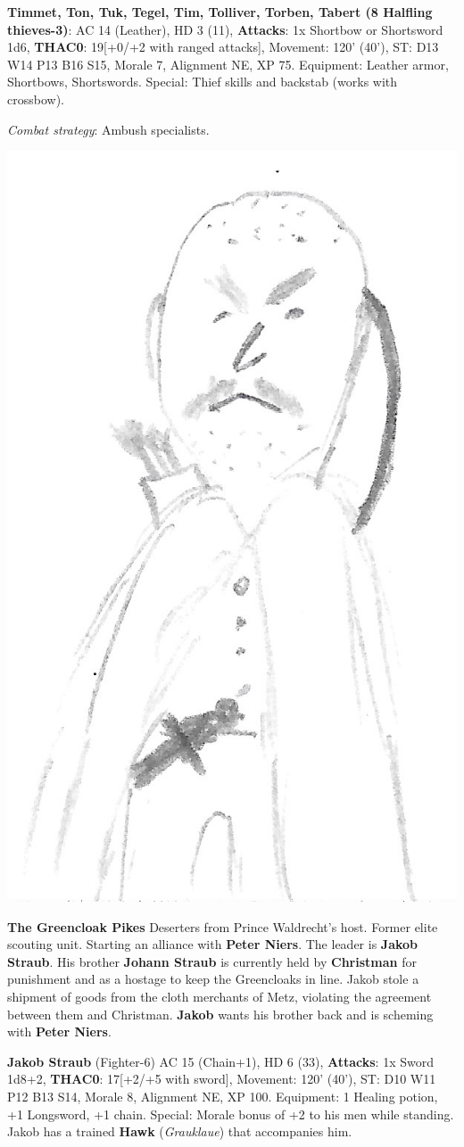 \documentclass[
]{book}
\begin{document}
\textbf{Timmet, Ton, Tuk, Tegel, Tim, Tolliver, Torben, Tabert (8 Halfling thieves-3)}: AC 14 (Leather), HD 3 (11), \textbf{Attacks}: 1x Shortbow or Shortsword 1d6, \textbf{THAC0}: 19{[}+0/+2 with ranged attacks{]}, Movement: 120' (40'), ST: D13 W14 P13 B16 S15, Morale 7, Alignment NE, XP 75. Equipment: Leather armor, Shortbows, Shortswords. Special: Thief skills and backstab (works with crossbow).

\emph{Combat strategy}: Ambush specialists.

\begin{center}\includegraphics[width=0.5\linewidth]{graphics/halfling1} \end{center}

\textbf{The Greencloak Pikes}
Deserters from Prince Waldrecht's host. Former elite scouting unit. Starting an alliance with \textbf{Peter Niers}. The leader is \textbf{Jakob Straub}. His brother \textbf{Johann Straub} is currently held by \textbf{Christman} for punishment and as a hostage to keep the Greencloaks in line. Jakob stole a shipment of goods from the cloth merchants of Metz, violating the agreement between them and Christman. \textbf{Jakob} wants his brother back and is scheming with \textbf{Peter Niers}.

\textbf{Jakob Straub} (Fighter-6) AC 15 (Chain+1), HD 6 (33), \textbf{Attacks}: 1x Sword 1d8+2, \textbf{THAC0}: 17{[}+2/+5 with sword{]}, Movement: 120' (40'), ST: D10 W11 P12 B13 S14, Morale 8, Alignment NE, XP 100. Equipment: 1 Healing potion, +1 Longsword, +1 chain. Special: Morale bonus of +2 to his men while standing. Jakob has a trained \textbf{Hawk} (\emph{Grauklaue}) that accompanies him.
\end{document}
